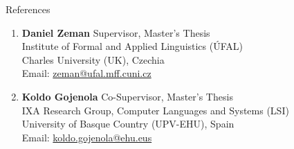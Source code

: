 \documentclass{resume} %
\begin{document}
\begin{rSection}{References}

    \begin{enumerate}
        \item \textbf{Daniel Zeman} \hfill Supervisor, Master's Thesis\\
            Institute of Formal and Applied Linguistics ({\'U}FAL)\\
            Charles University (UK), Czechia\\
            Email: \href{mailto:zeman@ufal.mff.cuni.cz}{zeman@ufal.mff.cuni.cz}
        
        \item \textbf{Koldo Gojenola} \hfill Co-Supervisor, Master's Thesis\\
            IXA Research Group, Computer Languages and Systems (LSI)\\
            University of Basque Country (UPV-EHU), Spain\\
            Email: \href{mailto:koldo.gojenola@ehu.eus}{koldo.gojenola@ehu.eus}
    \end{enumerate}

\end{rSection}
\end{document}
